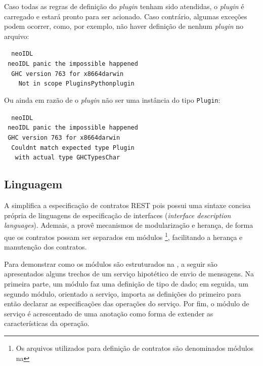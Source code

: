 Caso todas as regras de definição do \textit{plugin} tenham sido atendidas, o
\textit{plugin} é carregado e estará pronto para ser acionado. Caso contrário,
algumas exceções podem ocorrer, como, por exemplo, não haver definição de
nenhum \textit{plugin} no arquivo:

\begin{tabbing}\tt
~neoIDL\\
\tt ~neoIDL~panic~the~impossible~happened\\
\tt ~~GHC~version~763~for~x8664darwin\\
\tt ~~~~Not~in~scope~PluginsPythonplugin
\end{tabbing}

Ou ainda em razão de o \textit{plugin} não ser uma instância do tipo
\texttt{Plugin}:

\begin{tabbing}\tt
~neoIDL\\
\tt ~neoIDL~panic~the~impossible~happened\\
\tt ~GHC~version~763~for~x8664darwin\\
\tt ~~Couldnt~match~expected~type~Plugin\\
\tt ~~~with~actual~type~GHCTypesChar
\end{tabbing}



\subsection{Linguagem}
\label{linguagemNeoIDL}
\vspace{-6mm}

A \neoidl{} simplifica a especificação de contratos REST pois possui uma sintaxe
concisa própria de linguagens de especificação de interfaces (\emph{interface
description languages}). Ademais, a \neoidl{} provê mecanismos de
modularização e herança, de forma que os contratos possam ser separados em
módulos \footnote{Os arquivos utilizados para definição de contratos
são denominados módulos na \neoidl{}}, facilitando a herança e manutenção dos
contratos.

Para demonstrar como os módulos são estruturados na
\neoidl{}, a seguir são apresentados alguns trechos de um serviço hipotético
de envio de mensagens. Na primeira parte, um módulo faz uma definição de tipo
de dado; em seguida, um segundo módulo, orientado a serviço, importa as
definições do primeiro para então declarar as especificações das operações do
serviço. Por fim, o módulo de serviço é acrescentado de uma anotação como
forma de extender as características da operação.

